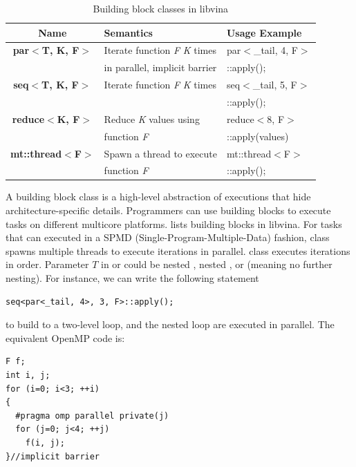 \begin{table}[hbt]
\caption{Building block classes in libvina}
\begin{tabular}{|c|l|l|}
\hline
Name& Semantics& Usage Example\\
\hline
\textbf{par$<$T, K, F$>$}& Iterate function \textit{F} \textit{K} times &par$<$\_tail, 4, F$>$\\ 
                         &in parallel, implicit barrier                 &::apply();\\                
\hline
\textbf{seq$<$T, K, F$>$}& Iterate function \textit{F} \textit{K} times&seq$<$\_tail, 5, F$>$\\
                         &                                             &::apply();\\
\hline
\textbf{reduce$<$K, F$>$}&Reduce \textit{K} values using &reduce$<$8, F$>$\\
&function
\textit{F}&::apply(values)\\
\hline
\textbf{mt::thread$<$F$>$}&Spawn a thread to execute  & mt::thread$<$F$>$\\
                          &function \textit{F}        & ::apply();\\
\hline
\end{tabular}\label{tbl:bb}
\end{table}

A building block class is a high-level abstraction of executions that
hide architecture-specific details. Programmers can use building blocks to
execute tasks on different multicore platforms.
 lists building blocks in libvina. For tasks that can
executed in a SPMD (Single-Program-Multiple-Data) fashion,  class spawns
multiple threads to execute iterations in parallel.  class 
executes iterations in order. Parameter $T$ in  or  could be nested
, nested , or  (meaning no further nesting).
For instance, we can write the following statement 


\begin{lstlisting}
seq<par<_tail, 4>, 3, F>::apply();
\end{lstlisting}
to build to a two-level loop, and the nested loop are executed in
parallel. The equivalent OpenMP code is:
\begin{lstlisting}
F f;
int i, j;
for (i=0; i<3; ++i)
{
  #pragma omp parallel private(j)
  for (j=0; j<4; ++j) 
    f(i, j);
}//implicit barrier
\end{lstlisting}

